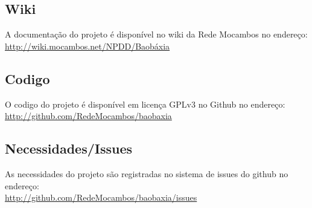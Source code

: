 \subsection{Wiki}
A documentação do projeto é disponível no wiki da Rede Mocambos no
endereço: \\
\url{http://wiki.mocambos.net/NPDD/Baobáxia}

\subsection{Codigo}
O codigo do projeto é disponível em licença GPLv3 no Github no
endereço: \\
\url{http://github.com/RedeMocambos/baobaxia}

\subsection{Necessidades/Issues}
As necessidades do projeto são registradas no sistema de issues do
github no endereço: \\
\url{http://github.com/RedeMocambos/baobaxia/issues}

